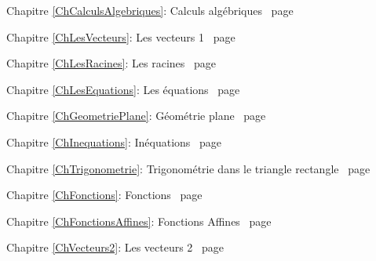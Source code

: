 \documentclass[TS]{sesamanuel}
\begin{document}
\begin{commentaire}

\textcolor{PartieFonction}{\PrerequisTitleFont 
Chapitre \ref{ChCalculsAlgebriques}: Calculs algébriques \dotfill\ page \pageref{ChCalculsAlgebriques}}

\vspace{2em}

\textcolor{PartieGeometrie}{\PrerequisTitleFont 
Chapitre \ref{ChLesVecteurs}: Les vecteurs 1 \dotfill\ page \pageref{ChLesVecteurs}}

\vspace{2em}

\textcolor{PartieFonction}{\PrerequisTitleFont 
Chapitre \ref{ChLesRacines}: Les racines \dotfill\ page \pageref{ChLesRacines}}

\vspace{2em}

\textcolor{PartieFonction}{\PrerequisTitleFont 
Chapitre \ref{ChLesEquations}: Les équations \dotfill\ page \pageref{ChLesEquations}}

\vspace{2em}

\textcolor{PartieGeometrie}{\PrerequisTitleFont 
Chapitre \ref{ChGeometriePlane}: Géométrie plane \dotfill\ page \pageref{ChGeometriePlane}}

\vspace{2em}

\textcolor{PartieFonction}{\PrerequisTitleFont 
Chapitre \ref{ChInequations}: Inéquations \dotfill\ page \pageref{ChInequations}}

\vspace{2em}

\textcolor{PartieGeometrie}{\PrerequisTitleFont 
Chapitre \ref{ChTrigonometrie}: Trigonométrie dans le triangle rectangle \dotfill\ page \pageref{ChTrigonometrie}}

\vspace{2em}

\textcolor{PartieFonction}{\PrerequisTitleFont 
Chapitre \ref{ChFonctions}: Fonctions \dotfill\ page \pageref{ChFonctions}}

\vspace{2em}

\textcolor{PartieFonction}{\PrerequisTitleFont 
Chapitre \ref{ChFonctionsAffines}: Fonctions Affines \dotfill\ page \pageref{ChFonctionsAffines}}

\vspace{2em}

\textcolor{PartieFonction}{\PrerequisTitleFont 
Chapitre \ref{ChVecteurs2}: Les vecteurs 2 \dotfill\ page \pageref{ChVecteurs2}}

\vspace{2em}

\end{commentaire}
\end{document}
